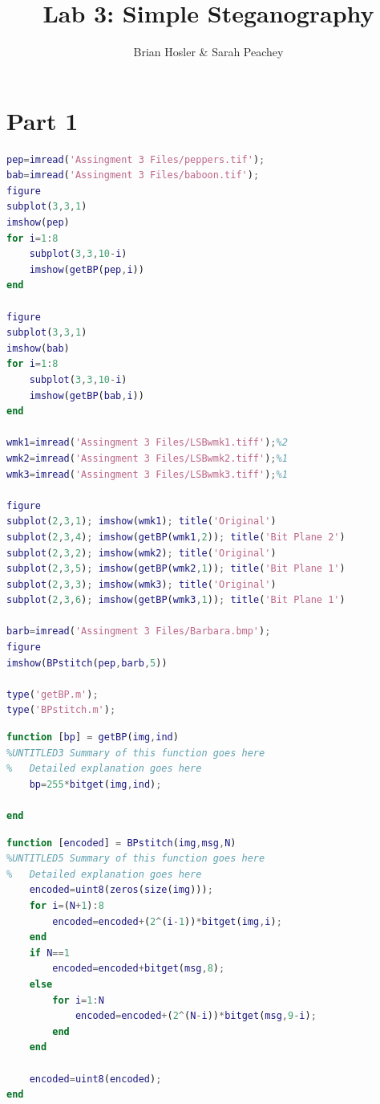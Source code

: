 \documentclass{article}
\begin{document}
\title{Lab 3: Simple Steganography}
\author{Brian Hosler \& Sarah Peachey }
\maketitle 

\section{Part 1}



\begin{lstlisting}[language=Matlab]
pep=imread('Assingment 3 Files/peppers.tif');
bab=imread('Assingment 3 Files/baboon.tif');
figure
subplot(3,3,1)
imshow(pep)
for i=1:8
    subplot(3,3,10-i)
    imshow(getBP(pep,i))
end

figure
subplot(3,3,1)
imshow(bab)
for i=1:8
    subplot(3,3,10-i)
    imshow(getBP(bab,i))
end

wmk1=imread('Assingment 3 Files/LSBwmk1.tiff');%2
wmk2=imread('Assingment 3 Files/LSBwmk2.tiff');%1
wmk3=imread('Assingment 3 Files/LSBwmk3.tiff');%1

figure
subplot(2,3,1); imshow(wmk1); title('Original')
subplot(2,3,4); imshow(getBP(wmk1,2)); title('Bit Plane 2')
subplot(2,3,2); imshow(wmk2); title('Original')
subplot(2,3,5); imshow(getBP(wmk2,1)); title('Bit Plane 1')
subplot(2,3,3); imshow(wmk3); title('Original')
subplot(2,3,6); imshow(getBP(wmk3,1)); title('Bit Plane 1')

barb=imread('Assingment 3 Files/Barbara.bmp');
figure
imshow(BPstitch(pep,barb,5))

type('getBP.m');
type('BPstitch.m');

\end{lstlisting}

\begin{lstlisting}[language=Matlab]
function [bp] = getBP(img,ind)
%UNTITLED3 Summary of this function goes here
%   Detailed explanation goes here
    bp=255*bitget(img,ind);

end
\end{lstlisting}


\begin{lstlisting}[language=Matlab]
function [encoded] = BPstitch(img,msg,N)
%UNTITLED5 Summary of this function goes here
%   Detailed explanation goes here
    encoded=uint8(zeros(size(img)));
    for i=(N+1):8
        encoded=encoded+(2^(i-1))*bitget(img,i);
    end
    if N==1
        encoded=encoded+bitget(msg,8);
    else
        for i=1:N
            encoded=encoded+(2^(N-i))*bitget(msg,9-i);
        end
    end

    encoded=uint8(encoded);
end

\end{lstlisting}
    
\end{document}
